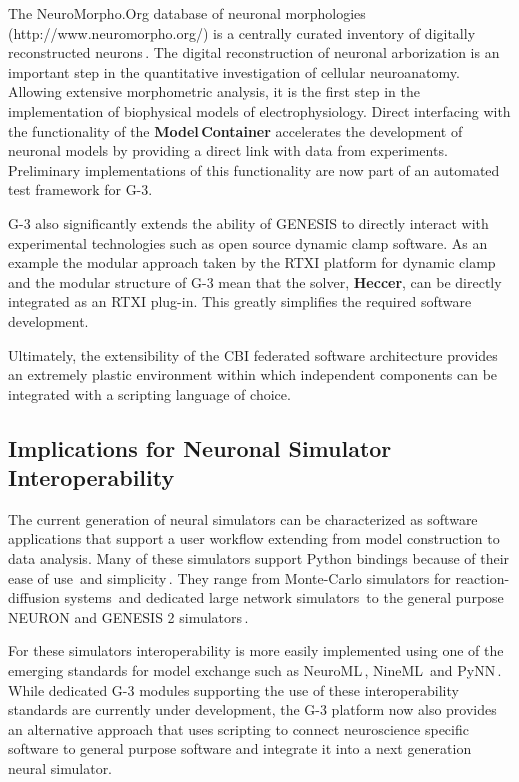 \documentclass[12pt]{article}
\begin{document}
The NeuroMorpho.Org database of neuronal morphologies
(http://www.neuromorpho.org/) is a centrally curated inventory of
digitally reconstructed neurons\,\cite{ascoli06:_mobil}.  The digital
reconstruction of neuronal arborization is an important step in the
quantitative investigation of cellular neuroanatomy.  Allowing
extensive morphometric analysis, it is the first step in the
implementation of biophysical models of electrophysiology.  Direct
interfacing with the functionality of the {\bf Model\,Container}
accelerates the development of neuronal models by providing a direct
link with data from experiments.  Preliminary implementations of this
functionality are now part of an automated test framework for G-3.

G-3 also significantly extends the ability of GENESIS to directly
interact with experimental technologies such as open source dynamic
clamp software.  As an example the modular approach taken by the RTXI
platform for dynamic
clamp\,\cite{bettencourt08:_effec_imper_dynam_clamp, dorval01:_real}
and the modular structure of G-3 mean that the solver, {\bf Heccer},
can be directly integrated as an RTXI plug-in.  This greatly simplifies the required software development.

Ultimately, the extensibility of the CBI federated software
architecture provides an extremely plastic environment within which
independent components can be integrated with a scripting language of
choice.



\subsection{Implications for Neuronal Simulator Interoperability}

The current generation of neural simulators can be characterized as
software applications that support a user workflow extending from
model construction to data analysis.  Many of these simulators support
Python bindings because of their ease of use\,\cite{pecevski09:_pcsim}
and simplicity\,\cite{goodman08:_brian}.  They range from Monte-Carlo
simulators for reaction-diffusion systems\,\cite{wils09:_steps} and
dedicated large network simulators\,\cite{eppler08:_pynes} to the
general purpose NEURON and GENESIS 2
simulators\,\cite{hines09:_neuron_python, bower98:_book_genes}.

For these simulators interoperability is more easily implemented using
one of the emerging standards for model exchange such as
NeuroML\,\cite{nigel01:_towar_neurom},
NineML\,\cite{gortechnikov10:_ninem_user_layer} and
PyNN\,\cite{andrew08:_pynn}.  While dedicated G-3 modules supporting
the use of these interoperability standards are currently under
development, the G-3 platform now also provides an alternative
approach that uses scripting to connect neuroscience specific software
to general purpose software and integrate it into a next generation
neural simulator.
\end{document}
